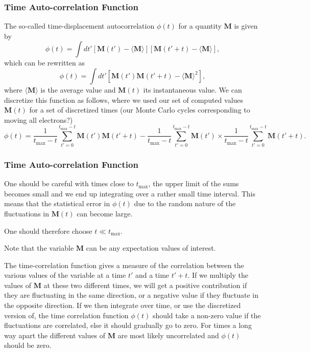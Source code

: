 \documentclass{beamer}
\begin{document}
\begin{frame}
\frametitle{Time Auto-correlation Function}

\begin{block}{}
The so-called time-displacement autocorrelation $\phi(t)$ for a quantity $\mathbf{M}$ is given by
\[
\phi(t) = \int dt' \left[\mathbf{M}(t')-\langle \mathbf{M} \rangle\right]\left[\mathbf{M}(t'+t)-\langle \mathbf{M} \rangle\right],
\]
which can be rewritten as 
\[
\phi(t) = \int dt' \left[\mathbf{M}(t')\mathbf{M}(t'+t)-\langle \mathbf{M} \rangle^2\right],
\]
where $\langle \mathbf{M} \rangle$ is the average value and
$\mathbf{M}(t)$ its instantaneous value. We can discretize this function as follows, where we used our
set of computed values $\mathbf{M}(t)$ for a set of discretized times (our Monte Carlo cycles corresponding to moving all electrons?)
\[
\phi(t)  = \frac{1}{t_{\mathrm{max}}-t}\sum_{t'=0}^{t_{\mathrm{max}}-t}\mathbf{M}(t')\mathbf{M}(t'+t)
-\frac{1}{t_{\mathrm{max}}-t}\sum_{t'=0}^{t_{\mathrm{max}}-t}\mathbf{M}(t')\times
\frac{1}{t_{\mathrm{max}}-t}\sum_{t'=0}^{t_{\mathrm{max}}-t}\mathbf{M}(t'+t).
\label{eq:phitf}
\]
\end{block}
\end{frame}

\begin{frame}
\frametitle{Time Auto-correlation Function}

\begin{block}{}
One should be careful with times close to $t_{\mathrm{max}}$, the upper limit of the sums 
becomes small and we end up integrating over a rather small time interval. This means that the statistical
error in $\phi(t)$ due to the random nature of the fluctuations in $\mathbf{M}(t)$ can become large.

One should therefore choose $t \ll t_{\mathrm{max}}$.

Note that the variable $\mathbf{M}$ can be any expectation values of interest.

The time-correlation function gives a measure of the correlation between the various values of the variable 
at a time $t'$ and a time $t'+t$. If we multiply the values of $\mathbf{M}$ at these two different times,
we will get a positive contribution if they are fluctuating in the same direction, or a negative value
if they fluctuate in the opposite direction. If we then integrate over time, or use the discretized version of, the time correlation function $\phi(t)$ should take a non-zero value if the fluctuations are 
correlated, else it should gradually go to zero. For times a long way apart 
the different values of $\mathbf{M}$  are most likely 
uncorrelated and $\phi(t)$ should be zero.
\end{block}
\end{frame}
\end{document}
